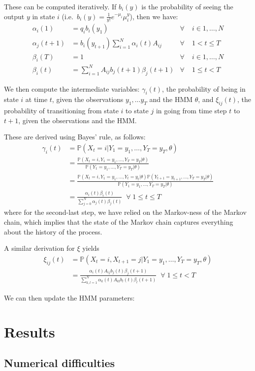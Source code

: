 \documentclass[11pt, twoside]{article}
\begin{document}
These can be computed iteratively. If $b_i(y)$ is the probability of seeing the output $y$ in state $i$ (i.e.\ $b_i(y) = \frac{1}{y!} e^{-\mu_i} \mu_i^y$), then we have:
\begin{align*}
	\alpha_i(1) &= q_i b_i(y_1) & \forall &\; i \in {1, \ldots, N} \\
	\alpha_j(t+1) &= b_i(y_{t+1}) \sum_{i=1}^{N} \alpha_i(t) A_{ij} & \forall &\; 1 < t \leq T \\
	\beta_i(T) &= 1 & \forall &\; i \in {1, \ldots, N} \\
	\beta_i(t) &= \sum_{i=1}^N A_{ij} b_j(t+1) \beta_j(t+1) & \forall &\; 1 \leq t < T
\end{align*}

We then compute the intermediate variables: $\gamma_i(t)$, the probability of being in state $i$ at time $t$, given the observations $y_1, \ldots y_T$ and the HMM $\theta$, and $\xi_{ij}(t)$, the probability of transitioning from state $i$ to state $j$ in going from time step $t$ to $t+1$, given the observations and the HMM.

These are derived using Bayes' rule, as follows:
\begin{align*}
	\gamma_i(t) &= \mathbb{P}(X_t = i | Y_1=y_1, \ldots, Y_T=y_T, \theta) \\
	            &= \frac{\mathbb{P}(X_t = i, Y_1=y_1, \ldots, Y_T=y_T | \theta)}{\mathbb{P}(Y_1=y_1, \ldots, Y_T=y_T | \theta)} \\
	            &= \frac{\mathbb{P}(X_t = i, Y_1=y_1, \ldots, Y_t=y_t | \theta) \mathbb{P}(Y_{t+1}=y_{t+1}, \ldots, Y_T=y_T | \theta)}{\mathbb{P}(Y_1=y_1, \ldots, Y_T=y_T | \theta)} \\
	            &= \frac{\alpha_i(t) \beta_i(t)}{\sum_{j=0}^N \alpha_j(t) \beta_j(t)} \; \; \forall \; 1 \leq t \leq T
\end{align*}
where for the second-last step, we have relied on the Markov-ness of the Markov chain, which implies that the state of the Markov chain captures everything about the history of the process.

A similar derivation for $\xi$ yields
\begin{align*}
	\xi_{ij}(t) &= \mathbb{P}(X_t=i, X_{t+1}=j | Y_1=y_1, \ldots, Y_T=y_T, \theta) \\
	            &= \frac{\alpha_i(t) A_{ij} b_j(t) \beta_j(t+1)}{\sum_{k,l=1}^N \alpha_k(t) A_{kl} b_l(t) \beta_l(t+1)} \; \; \forall \; 1 \leq t < T
\end{align*}

We can then update the HMM parameters:



\section{Results}

\subsection{Numerical difficulties}
\end{document}
